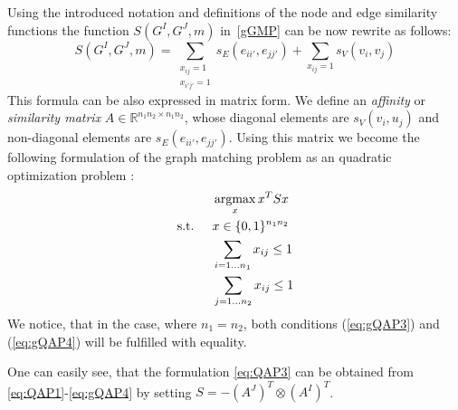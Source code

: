 Using the introduced notation and definitions of the node and edge similarity functions the function $S(G^I,G^J,m)$ in~\eqref{gGMP} can be now rewrite as follows:
\begin{equation}\label{eq:sumQAP}
	S(G^I,G^J,m)=\sum_{\substack{x_{ij}=1\\x_{i'j'}=1}}s_E(e_{ii'},e_{jj'}) + \sum_{x_{ij}=1}s_V(v_{i},v_{j})
\end{equation}
This formula can be also expressed in matrix form. We define an \emph{affinity} or \emph{similarity matrix} $A\in\mathbb{R}^{n_1n_2\times n_1n_2}$, whose diagonal elements are $s_V(v_i, u_j)$ and non-diagonal elements are $s_E(e_{ii\prime}, e_{jj\prime})$. Using this matrix we become the following formulation of the graph matching problem as an quadratic optimization problem \cite{Cho2014_Haystack, Cho2010_RRWM, Cho2012_ProgressiveGM, Conte2004,Leordeanu2009_IPFP}:
\begin{alignat}{2}
    &     && \argmax_x{x^TSx}                           \label{eq:gQAP1}\\ %
    & \text{s.t. } &&  x\in \{0,1\}^{n_1n_2}            \label{eq:gQAP2}\\
    &             &&  \sum_{i=1\dots n_1} x_{ij}\le 1    \label{eq:gQAP3}\\
    &             &&  \sum_{j=1\dots n_2} x_{ij}\le 1    \label{eq:gQAP4}
\end{alignat}
We notice, that in the case, where $n_1=n_2$, both conditions (\ref{eq:gQAP3}) and (\ref{eq:gQAP4}) will be fulfilled with equality.

One can easily see, that the formulation \eqref{eq:QAP3} can be obtained from \eqref{eq:QAP1}-\eqref{eq:gQAP4} by setting $S=-(A^J)^T\otimes(A^I)^T$.

